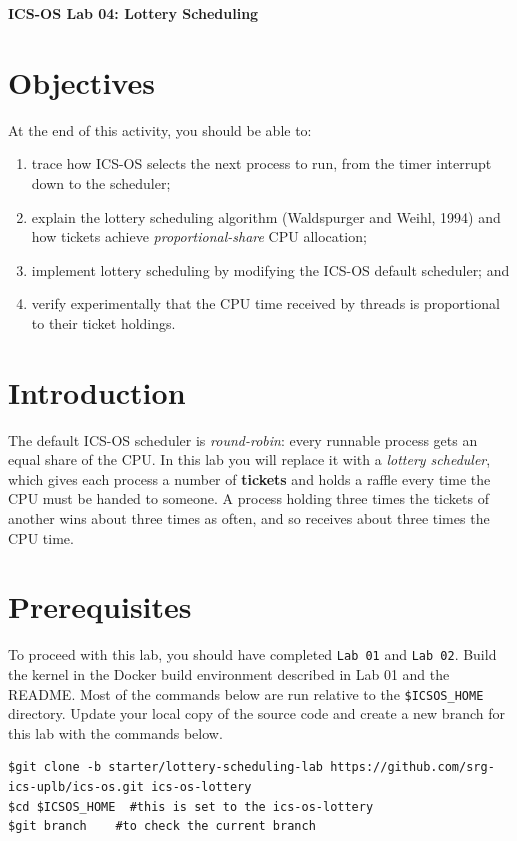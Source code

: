 \documentclass[a4paper, 11pt,oneside]{article}
\begin{document}
\begin{center}
   {\LARGE \textbf{ICS-OS Lab 04: Lottery Scheduling}}
\end{center}

\section*{Objectives}
   At the end of this activity, you should be able to:
   \begin{enumerate}[itemsep=0pt,parsep=0pt]
       \item trace how ICS-OS selects the next process to run, from the timer interrupt down to the scheduler;
       \item explain the lottery scheduling algorithm (Waldspurger and Weihl, 1994) and how tickets achieve \textit{proportional-share} CPU allocation;
       \item implement lottery scheduling by modifying the ICS-OS default scheduler; and
       \item verify experimentally that the CPU time received by threads is proportional to their ticket holdings.
   \end{enumerate}

\section{Introduction}
The default ICS-OS scheduler is \textit{round-robin}: every runnable process gets an equal share of the CPU. In this lab you will replace it with a \textit{lottery scheduler}, which gives each process a number of \textbf{tickets} and holds a raffle every time the CPU must be handed to someone. A process holding three times the tickets of another wins about three times as often, and so receives about three times the CPU time.

\section{Prerequisites}

To proceed with this lab, you should have completed \texttt{Lab 01} and \texttt{Lab 02}. Build the kernel in the Docker build environment described in Lab 01 and the README. Most of the commands below are run relative to the \texttt{\$ICSOS\_HOME} directory. Update your local copy of the source code and create a new branch for this lab with the commands below.

\begin{verbatim}
$git clone -b starter/lottery-scheduling-lab https://github.com/srg-ics-uplb/ics-os.git ics-os-lottery
$cd $ICSOS_HOME  #this is set to the ics-os-lottery
$git branch    #to check the current branch
\end{verbatim}
\end{document}
